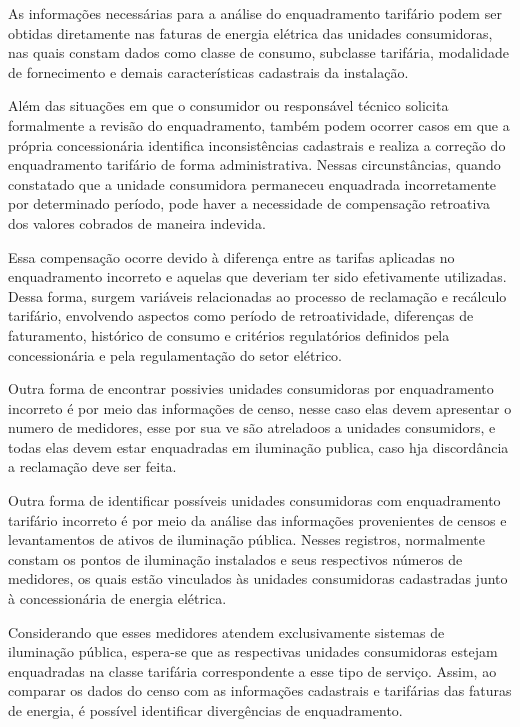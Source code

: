 \documentclass[12pt,a4paper]{article}
\begin{document}
As informações necessárias para a análise do enquadramento tarifário podem ser obtidas diretamente nas faturas de energia elétrica das unidades consumidoras, nas quais constam dados como classe de consumo, subclasse tarifária, modalidade de fornecimento e demais características cadastrais da instalação.

Além das situações em que o consumidor ou responsável técnico solicita formalmente a revisão do enquadramento, também podem ocorrer casos em que a própria concessionária identifica inconsistências cadastrais e realiza a correção do enquadramento tarifário de forma administrativa. Nessas circunstâncias, quando constatado que a unidade consumidora permaneceu enquadrada incorretamente por determinado período, pode haver a necessidade de compensação retroativa dos valores cobrados de maneira indevida.

Essa compensação ocorre devido à diferença entre as tarifas aplicadas no enquadramento incorreto e aquelas que deveriam ter sido efetivamente utilizadas. Dessa forma, surgem variáveis relacionadas ao processo de reclamação e recálculo tarifário, envolvendo aspectos como período de retroatividade, diferenças de faturamento, histórico de consumo e critérios regulatórios definidos pela concessionária e pela regulamentação do setor elétrico.

Outra forma de encontrar possivies unidades consumidoras por enquadramento incorreto é por meio das informações de censo, nesse caso elas devem apresentar o numero de medidores, esse por sua ve são atreladoos a unidades consumidors, e todas elas devem estar enquadradas em iluminação publica, caso hja discordância a reclamação deve ser feita.

Outra forma de identificar possíveis unidades consumidoras com enquadramento tarifário incorreto é por meio da análise das informações provenientes de censos e levantamentos de ativos de iluminação pública. Nesses registros, normalmente constam os pontos de iluminação instalados e seus respectivos números de medidores, os quais estão vinculados às unidades consumidoras cadastradas junto à concessionária de energia elétrica.

Considerando que esses medidores atendem exclusivamente sistemas de iluminação pública, espera-se que as respectivas unidades consumidoras estejam enquadradas na classe tarifária correspondente a esse tipo de serviço. Assim, ao comparar os dados do censo com as informações cadastrais e tarifárias das faturas de energia, é possível identificar divergências de enquadramento.
\end{document}

